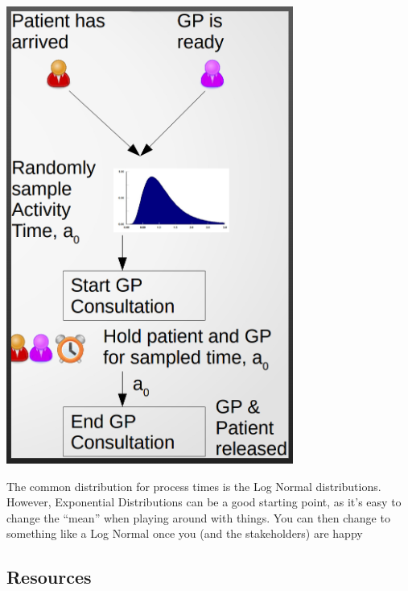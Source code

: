 \documentclass[
  letterpaper,
  DIV=11,
  numbers=noendperiod]{scrreprt}
\begin{document}
\includegraphics{images/activity_activity_times.png}

\begin{tcolorbox}[enhanced jigsaw, colframe=quarto-callout-tip-color-frame, bottomtitle=1mm, breakable, rightrule=.15mm, coltitle=black, colbacktitle=quarto-callout-tip-color!10!white, opacityback=0, leftrule=.75mm, arc=.35mm, toptitle=1mm, title=\textcolor{quarto-callout-tip-color}{\faLightbulb}\hspace{0.5em}{Tip}, titlerule=0mm, colback=white, toprule=.15mm, bottomrule=.15mm, left=2mm, opacitybacktitle=0.6]

The common distribution for process times is the Log Normal
distributions. However, Exponential Distributions can be a good starting
point, as it's easy to change the ``mean'' when playing around with
things. You can then change to something like a Log Normal once you (and
the stakeholders) are happy

\end{tcolorbox}

\subsection{Resources}\label{resources}
\end{document}
